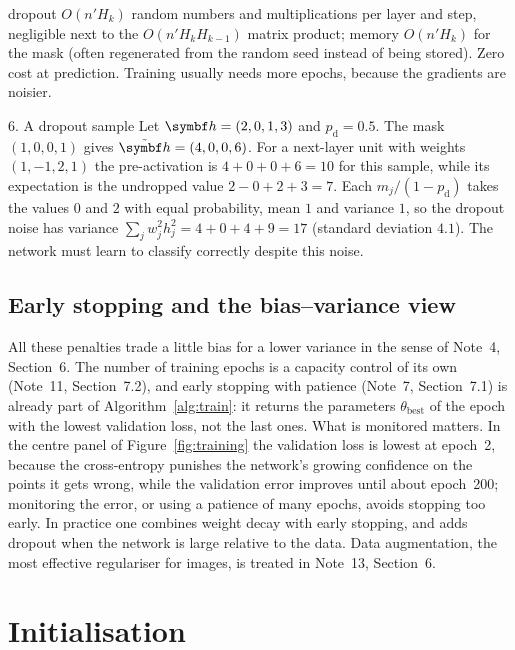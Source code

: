 \documentclass[11pt]{article}
\newcommand{\hv}{\vect{h}}
\begin{document}
\begin{runtime}{dropout}
$O(n'H_k)$ random numbers and multiplications per layer and step, negligible next to the $O(n'H_kH_{k-1})$ matrix product;
memory $O(n'H_k)$ for the mask (often regenerated from the random seed instead of being stored). Zero cost at prediction.
Training usually needs more epochs, because the gradients are noisier.
\end{runtime}

\begin{worked}{6. A dropout sample}
Let $\hv = (2, 0, 1, 3)$ and $p_{\mathrm{d}} = 0.5$. The mask $(1, 0, 0, 1)$ gives $\tilde{\hv} = (4, 0, 0, 6)$. For a next-layer
unit with weights $(1, -1, 2, 1)$ the pre-activation is $4 + 0 + 0 + 6 = 10$ for this sample, while its expectation is
the undropped value $2 - 0 + 2 + 3 = 7$. Each $m_j/(1 - p_{\mathrm{d}})$ takes the values $0$ and $2$ with equal probability,
mean $1$ and variance $1$, so the dropout noise has variance $\sum_j w_j^2h_j^2 = 4 + 0 + 4 + 9 = 17$ (standard deviation
$4.1$). The network must learn to classify correctly despite this noise.
\end{worked}

\subsection{Early stopping and the bias--variance view}\label{sec:early}

All these penalties trade a little bias for a lower variance in the sense of Note~4, Section~6. The number of training
epochs is a capacity control of its own (Note~11, Section~7.2), and early stopping with patience (Note~7, Section~7.1)
is already part of Algorithm~\ref{alg:train}: it returns the parameters $\theta_{\text{best}}$ of the epoch with the
lowest validation loss, not the last ones. What is monitored matters. In the centre panel of
Figure~\ref{fig:training} the validation loss is lowest at epoch~2, because the cross-entropy punishes the network's
growing confidence on the points it gets wrong, while the validation error improves until about epoch~200; monitoring
the error, or using a patience of many epochs, avoids stopping too early. In practice one combines weight decay with
early stopping, and adds dropout when the network is large relative to the data. Data augmentation, the most effective
regulariser for images, is treated in Note~13, Section~6.

\section{Initialisation}\label{sec:init}
\end{document}
